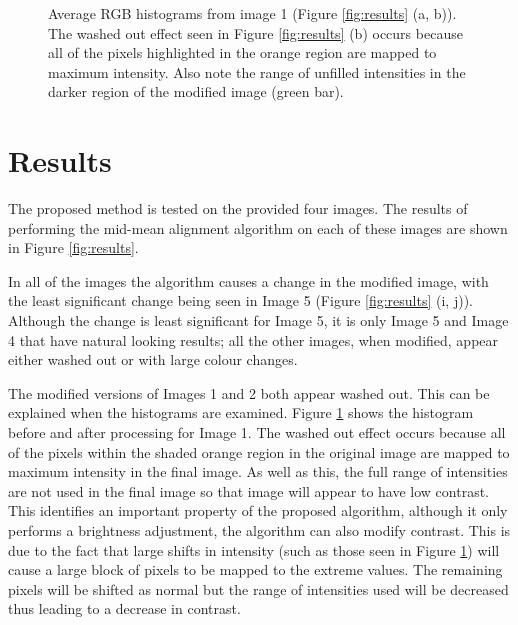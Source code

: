 \documentclass[journal,transmag]{IEEEtran}
\begin{document}
\begin{figure}[b]
	\centering
\caption{Average RGB histograms from image 1 (Figure \ref{fig:results} (a, b)).  The washed out effect seen in Figure \ref{fig:results} (b) occurs because all of the pixels highlighted in the orange region are mapped to maximum intensity.  Also note the range of unfilled intensities in the darker region of the modified image (green bar).}
\label{fig:image01_hists}
\end{figure}

\section{Results}
\label{sec:results}

The proposed method is tested on the provided four images.  The results of performing the mid-mean alignment algorithm on each of these images are shown in Figure \ref{fig:results}.

In all of the images the algorithm causes a change in the modified image, with the least significant change being seen in Image 5 (Figure \ref{fig:results} (i, j)).  Although the change is least significant for Image 5, it is only Image 5 and Image 4 that have natural looking results; all the other images, when modified, appear either washed out or with large colour changes.  

The modified versions of Images 1 and 2 both appear washed out.  This can be explained when the histograms are examined.  Figure \ref{fig:image01_hists} shows the histogram before and after processing for Image 1.  The washed out effect occurs because all of the pixels within the shaded orange region in the original image are mapped to maximum intensity in the final image.  As well as this, the full range of intensities are not used in the final image so that image will appear to have low contrast.  This identifies an important property of the proposed algorithm, although it only performs a brightness adjustment, the algorithm can also modify contrast.  This is due to the fact that large shifts in intensity (such as those seen in Figure \ref{fig:image01_hists}) will cause a large block of pixels to be mapped to the extreme values.  The remaining pixels will be shifted as normal but the range of intensities used will be decreased thus leading to a decrease in contrast.
\end{document}
